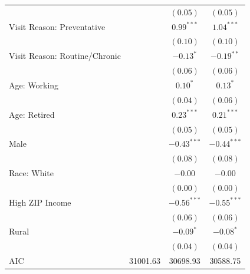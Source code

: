 \documentclass[12pt,twoside]{reedthesis}
\begin{document}
\begin{table}
\begin{center}
\begin{footnotesize}
\begin{tabular}{l c c c }
                                &                        & $(0.05)$               & $(0.05)$               \\
  Visit Reason: Preventative    &                        & $\mathbf{0.99}^{***}$  & $\mathbf{1.04}^{***}$  \\
                                &                        & $(0.10)$               & $(0.10)$               \\
  Visit Reason: Routine/Chronic &                        & $-0.13^{*}$            & $-0.19^{**}$           \\
                                &                        & $(0.06)$               & $(0.06)$               \\
  Age: Working                  &                        & $0.10^{*}$             & $0.13^{*}$             \\
                                &                        & $(0.04)$               & $(0.06)$               \\
  Age: Retired                  &                        & $\mathbf{0.23}^{***}$  & $\mathbf{0.21}^{***}$  \\
                                &                        & $(0.05)$               & $(0.05)$               \\
  Male                          &                        & $\mathbf{-0.43}^{***}$ & $\mathbf{-0.44}^{***}$ \\
                                &                        & $(0.08)$               & $(0.08)$               \\
  Race: White                   &                        & $-0.00$                & $-0.00$                \\
                                &                        & $(0.00)$               & $(0.00)$               \\
  High ZIP Income               &                        & $\mathbf{-0.56}^{***}$ & $\mathbf{-0.55}^{***}$ \\
                                &                        & $(0.06)$               & $(0.06)$               \\
  Rural                         &                        & $-0.09^{*}$            & $-0.08^{*}$            \\
                                &                        & $(0.04)$               & $(0.04)$               \\
  \hline
  AIC                           & 31001.63               & 30698.93               & 30588.75               \\

\end{tabular}
\end{footnotesize}
\end{center}
\end{table}
\end{document}
